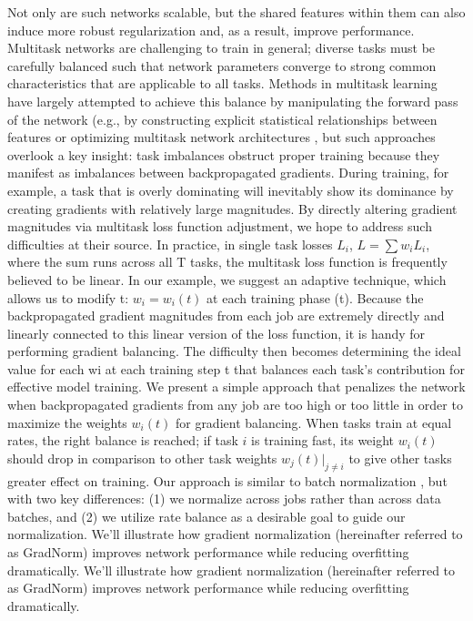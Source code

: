 \documentclass{article}
\begin{document}
Not only are such networks scalable, but the shared features within them can also induce more robust regularization and, as a result, improve performance. Multitask networks are challenging to train in general; diverse tasks must be carefully balanced such that network parameters converge to strong common characteristics that are applicable to all tasks. Methods in multitask learning have largely attempted to achieve this balance by manipulating the forward pass of the network (e.g., by constructing explicit statistical relationships between features \cite{long2017learning} or optimizing multitask network architectures \cite{misra2016cross}, but such approaches overlook a key insight: task imbalances obstruct proper training because they manifest as imbalances between backpropagated gradients. During training, for example, a task that is overly dominating will inevitably show its dominance by creating gradients with relatively large magnitudes. By directly altering gradient magnitudes via multitask loss function adjustment, we hope to address such difficulties at their source. In practice, in single task losses $L_{i}$, $L = \sum w_iL_i$, where the sum runs across all T tasks, the multitask loss function is frequently believed to be linear. In our example, we suggest an adaptive technique, which allows us to modify t: $w_i = w_i(t)$ at each training phase (t). Because the backpropagated gradient magnitudes from each job are extremely directly and linearly connected to this linear version of the loss function, it is handy for performing gradient balancing. The difficulty then becomes determining the ideal value for each wi at each training step t that balances each task's contribution for effective model training. We present a simple approach that penalizes the network when backpropagated gradients from any job are too high or too little in order to maximize the weights $w_i(t)$ for gradient balancing. When tasks train at equal rates, the right balance is reached; if task $i$ is training fast, its weight $w_i(t)$ should drop in comparison to other task weights $w_j(t)|_{j\neq i}$ to give other tasks greater effect on training. Our approach is similar to batch normalization \cite{ioffe2015batch}, but with two key differences: (1) we normalize across jobs rather than across data batches, and (2) we utilize rate balance as a desirable goal to guide our normalization. We'll illustrate how gradient normalization (hereinafter referred to as GradNorm) improves network performance while reducing overfitting dramatically. We'll illustrate how gradient normalization (hereinafter referred to as GradNorm) improves network performance while reducing overfitting dramatically. 
\end{document}
